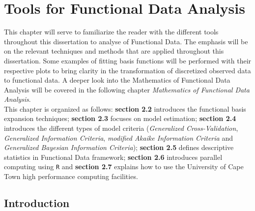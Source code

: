 
\chapter{Tools for Functional Data Analysis}\label{chap2} %

\label{Chapter2} %



This chapter will serve to familiarize the reader with the different tools throughout this dissertation to analyse of Functional Data. The emphasis will be on the relevant techniques and methods that are applied throughout this dissertation. Some examples of fitting basis functions will be performed with their respective plots to bring clarity in the transformation of discretized observed data to functional data. A deeper look into the  Mathematics of Functional Data Analysis will be covered in the following chapter \textit{Mathematics of Functional Data Analysis}.\\
This chapter is organized as follows: \textbf{section 2.2} introduces the functional basis expansion techniques; \textbf{section 2.3} focuses on model estimation;  \textbf{section 2.4} introduces the different types of model criteria (\textit{Generalized Cross-Validation}, \textit{Generalized Information Criteria}, \textit{modified Akaike Information Criteria} and \textit{Generalized Bayesian Information Criteria}); \textbf{section 2.5} defines descriptive statistics in Functional Data framework; \textbf{section 2.6} introduces parallel computing using \texttt{R} and \textbf{section 2.7} explains how to use the University of Cape Town high performance computing facilities.


\section{Introduction}\label{intro}

